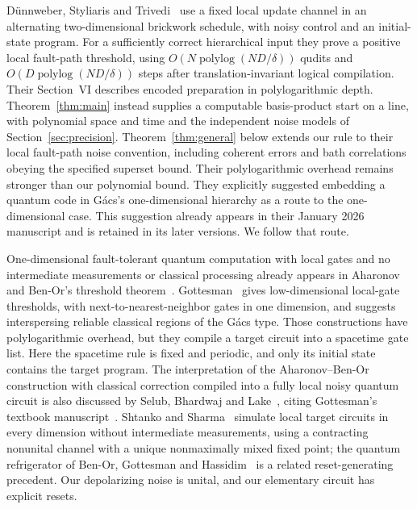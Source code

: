 D\"unnweber, Styliaris and Trivedi~\cite[Theorem~1]{DST2026} use a fixed local update channel in an alternating two-dimensional brickwork schedule, with noisy control and an initial-state program. For a sufficiently correct hierarchical input they prove a positive local fault-path threshold, using $O(N\operatorname{polylog}(ND/\delta))$ qudits and $O(D\operatorname{polylog}(ND/\delta))$ steps after translation-invariant logical compilation. Their Section~VI describes encoded preparation in polylogarithmic depth. Theorem~\ref{thm:main} instead supplies a computable basis-product start on a line, with polynomial space and time and the independent noise models of Section~\ref{sec:precision}. Theorem~\ref{thm:general} below extends our rule to their local fault-path noise convention, including coherent errors and bath correlations obeying the specified superset bound. Their polylogarithmic overhead remains stronger than our polynomial bound. They explicitly suggested embedding a quantum code in G\'acs's one-dimensional hierarchy as a route to the one-dimensional case. This suggestion already appears in their January 2026 manuscript and is retained in its later versions. We follow that route.

One-dimensional fault-tolerant quantum computation with local gates and no intermediate measurements or classical processing already appears in Aharonov and Ben-Or's threshold theorem~\cite[Theorem~13]{ABO2008}. Gottesman~\cite{Gottesman2000} gives low-dimensional local-gate thresholds, with next-to-nearest-neighbor gates in one dimension, and suggests interspersing reliable classical regions of the G\'acs type. Those constructions have polylogarithmic overhead, but they compile a target circuit into a spacetime gate list. Here the spacetime rule is fixed and periodic, and only its initial state contains the target program. The interpretation of the Aharonov--Ben-Or construction with classical correction compiled into a fully local noisy quantum circuit is also discussed by Selub, Bhardwaj and Lake~\cite[Section~1.2]{SBL2026}, citing Gottesman's textbook manuscript~\cite{Gottesman2024}. Shtanko and Sharma~\cite{SS2025} simulate local target circuits in every dimension without intermediate measurements, using a contracting nonunital channel with a unique nonmaximally mixed fixed point; the quantum refrigerator of Ben-Or, Gottesman and Hassidim~\cite{BGH2013} is a related reset-generating precedent. Our depolarizing noise is unital, and our elementary circuit has explicit resets.

